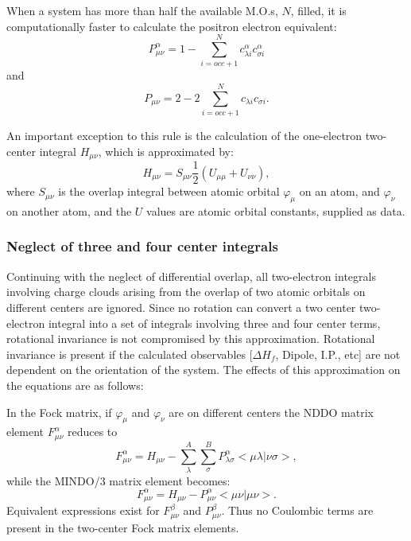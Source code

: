 When a system has more than half the available M.O.s, $N$,  filled, it
is computationally
faster to calculate the positron electron equivalent:
$$
     P_{\mu\nu}^{\alpha} = 1-\! \sum_{i=occ+1}^Nc_{\lambda i}^{\alpha}c_{\sigma  i}^{\alpha}
$$
and
$$
     P_{\mu\nu} = 2-\! 2\sum_{i=occ+1}^Nc_{\lambda i}c_{\sigma  i}.
$$

An important exception to this rule is the calculation of the one-electron
two-center integral $H_{\mu\nu}$, which is approximated by:
$$
H_{\mu\nu}= S_{\mu\nu}\frac{1}{2}(U_{\mu\mu}+U_{\nu\nu}),
$$
where $S_{\mu\nu}$ is the overlap integral between atomic orbital $\varphi_{\mu}$
on an atom, and  $\varphi_{\nu}$ on another atom, and the $U$ values are
atomic orbital constants, supplied as data.

\subsubsection{Neglect of three and four center integrals}\label{34}
Continuing with the neglect of differential overlap, all two-electron integrals
involving charge clouds arising from the overlap of two atomic orbitals on
different centers are ignored. Since no rotation can convert a two center
two-electron integral into a set of integrals involving three and four center
terms, rotational invariance is not compromised by this approximation.
Rotational invariance is present if the calculated observables [$\Delta H_f$,
Dipole, I.P., etc] are not dependent on the orientation of the system. The
effects of this approximation on the  equations are as follows:

In the Fock matrix, if $\varphi_{\mu}$ and $\varphi_{\nu}$ are on different
centers the NDDO matrix element $F_{\mu\nu}^{\alpha}$ reduces to
$$
 F_{\mu\nu}^{\alpha} = H_{\mu\nu}- \sum_{\lambda}^A\sum_{\sigma}^B
P_{\lambda\sigma}^{\alpha} <\mu\lambda|\nu\sigma>,
$$
while the MINDO/3 matrix element becomes:
$$
 F_{\mu\nu}^{\alpha} = H_{\mu\nu}- P_{\mu\nu}^{\alpha} <\mu\nu|\mu\nu>.
$$
Equivalent expressions exist for  $F_{\mu\nu}^{\beta}$ and
$P_{\mu\nu}^{\beta}$. Thus no Coulombic terms are present in the two-center
Fock matrix elements.

